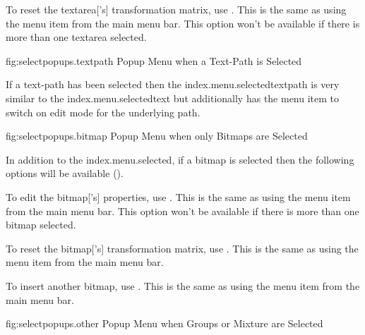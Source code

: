 
To reset the \gls{textarea}['s] transformation matrix, use 
. This is the same as using the 
 menu item from the main menu bar.
This option won't be available if there is more than one
\gls{textarea} selected.



\FloatFig
  {fig:selectpopups.textpath}
  {}
  {Popup Menu when a Text-Path is Selected}


If a text-path has been selected then the
\gls{index.menu.selectedtextpath} is very similar to the
\gls{index.menu.selectedtext} but additionally has the
 menu item to switch on edit mode for the
underlying path.



\FloatFig
  {fig:selectpopups.bitmap}
  {}
  {Popup Menu when only Bitmaps are Selected}

In addition to the \gls{index.menu.selected},
if a \gls{bitmap} is selected then the following options will be available
().


To edit the \gls{bitmap}['s] properties, use
. This is the same as using
the  menu item from the main menu bar.
This option won't be available if there is more than one
\gls{bitmap} selected.


To reset the \gls{bitmap}['s]
transformation matrix, use . This is the
same as using the  menu item from the main menu
bar.


To insert another \gls{bitmap}, use . This is the
same as using the  menu item from the main menu
bar.



\FloatFig
  {fig:selectpopups.other}
  {}
  {Popup Menu when Groups or Mixture are Selected}


